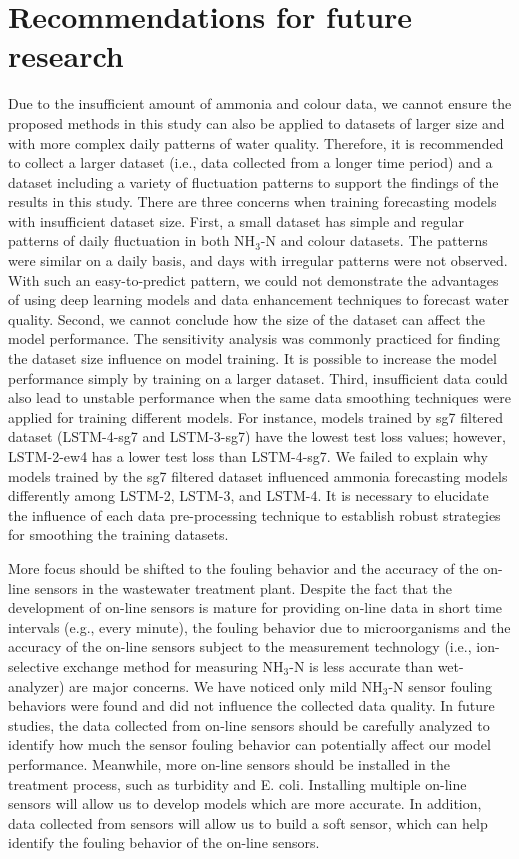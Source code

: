 \section{Recommendations for future research}
Due to the insufficient amount of ammonia and colour data, we cannot ensure the proposed methods in this study can also be applied to datasets of larger size and with more complex daily patterns of water quality. Therefore, it is recommended to collect a larger dataset (i.e., data collected from a longer time period) and a dataset including a variety of fluctuation patterns to support the findings of the results in this study. There are three concerns when training forecasting models with insufficient dataset size. First, a small dataset has simple and regular patterns of daily fluctuation in both NH$_{3}$-N and colour datasets. The patterns were similar on a daily basis, and days with irregular patterns were not observed. With such an easy-to-predict pattern, we could not demonstrate the advantages of using deep learning models and data enhancement techniques to forecast water quality. Second, we cannot conclude how the size of the dataset can affect the model performance. The sensitivity analysis was commonly practiced for finding the dataset size influence on model training. It is possible to increase the model performance simply by training on a larger dataset. Third, insufficient data could also lead to unstable performance when the same data smoothing techniques were applied for training different models. For instance, models trained by sg7 filtered dataset (LSTM-4-sg7 and LSTM-3-sg7) have the lowest test loss values; however, LSTM-2-ew4 has a lower test loss than LSTM-4-sg7. We failed to explain why models trained by the sg7 filtered dataset influenced ammonia forecasting models differently among LSTM-2, LSTM-3, and LSTM-4. It is necessary to elucidate the influence of each data pre-processing technique to establish robust strategies for smoothing the training datasets.

More focus should be shifted to the fouling behavior and the accuracy of the on-line sensors in the wastewater treatment plant. Despite the fact that the development of on-line sensors is mature for providing on-line data in short time intervals (e.g., every minute), the fouling behavior due to microorganisms and the accuracy of the on-line sensors subject to the measurement technology (i.e., ion-selective exchange method for measuring NH$_{3}$-N is less accurate than wet-analyzer) are major concerns. We have noticed only mild NH$_{3}$-N sensor fouling behaviors were found and did not influence the collected data quality. In future studies, the data collected from on-line sensors should be carefully analyzed to identify how much the sensor fouling behavior can potentially affect our model performance. Meanwhile, more on-line sensors should be installed in the treatment process, such as turbidity and E. coli. Installing multiple on-line sensors will allow us to develop models which are more accurate. In addition, data collected from sensors will allow us to build a soft sensor, which can help identify the fouling behavior of the on-line sensors.

